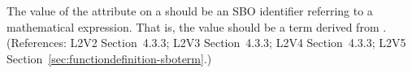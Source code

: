 The value of the  attribute on a \FunctionDefinition should be an
SBO identifier referring to a mathematical expression.  That is, the value
should be a term derived from \sbomathformula.  (References: L2V2 Section~4.3.3;
L2V3 Section~4.3.3; L2V4 Section~4.3.3; L2V5 Section~\ref{sec:functiondefinition-sboterm}.)

